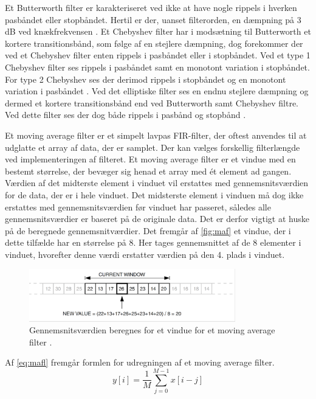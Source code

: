 \noindent
Et Butterworth filter er karakteriseret ved ikke at have nogle rippels i hverken pasbåndet eller stopbåndet. Hertil er der, uanset filterorden, en dæmpning på 3 dB ved knækfrekvensen \citep{nilsson2015}.
Et Chebyshev filter har i modsætning til Butterworth et kortere transitionsbånd, som følge af en stejlere dæmpning, dog forekommer der ved et Chebyshev filter enten rippels i pasbåndet eller i stopbåndet. Ved et type 1 Chebyshev filter ses rippels i pasbåndet samt en monotont variation i stopbåndet. For type 2 Chebyshev ses der derimod rippels i stopbåndet og en monotont variation i pasbåndet \citep{nilsson2015}. 
Ved det elliptiske filter ses en endnu stejlere dæmpning og dermed et kortere transitionsbånd end ved Butterworth samt Chebyshev filtre. Ved dette filter ses der dog både rippels i pasbånd og stopbånd \citep{nilsson2015}. 

\vspace{3mm}
\noindent
Et moving average filter er et simpelt lavpas FIR-filter, der oftest anvendes til at udglatte et array af data, der er samplet. Der kan vælges forskellig filterlængde ved implementeringen af filteret. Et moving average filter er et vindue med en bestemt størrelse, der bevæger sig henad et array med ét element ad gangen. Værdien af det midterste element i vinduet vil erstattes med gennemsnitsværdien for de data, der er i hele vinduet. Det midsterste element i vinduen må dog ikke erstattes med gennemsnitsværdien før vinduet har passeret, således alle gennemsnitsværdier er baseret på de originale data. Det er derfor vigtigt at huske på de beregnede gennemsnitværdier. Det fremgår af \autoref{fig:maf} et vindue, der i dette tilfælde har en størrelse på 8. Her tages gennemsnittet af de 8 elementer i vinduet, hvorefter denne værdi erstatter værdien på den 4. plads i vinduet.\citep{atmel2002}

\begin{figure} [H]
\centering
\includegraphics[width=0.8\textwidth]{figures/maf}
\caption{Gennemsnitsværdien beregnes for et vindue for et moving average filter \citep{atmel2002}.}
\label{fig:maf}
\end{figure} 

\noindent
Af \autoref{eq:mafl} fremgår formlen for udregningen af et moving average filter. 
\begin{equation}
y[i]=\dfrac{1}{M}\sum^{M-1}_{j=0} x[i-j]
\label{eq:mafl}
\end{equation}


